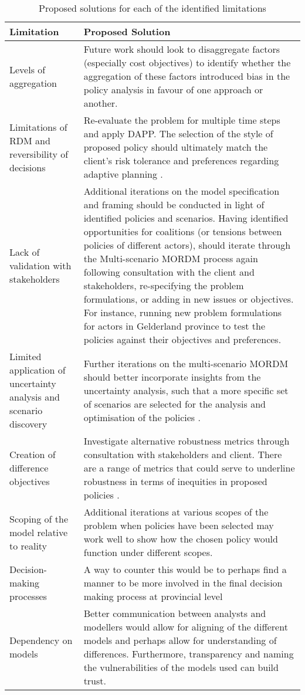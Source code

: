 \begin{table}[h]
\caption{Proposed solutions for each of the identified limitations}
\label{tab:Proposed Solutions}
\centering
\begin{tabular}{p{}|p{}}
\textbf{Limitation} & \textbf{Proposed Solution}  \\ \hline
Levels of aggregation & Future work should look to disaggregate factors (especially cost objectives) to identify whether the aggregation of these factors introduced bias in the policy analysis in favour of one approach or another. \\ \hline
Limitations of RDM and reversibility of decisions & Re-evaluate the problem for multiple time steps and apply DAPP. The selection of the style of proposed policy should ultimately match the client's risk tolerance and preferences regarding adaptive planning \parencite{marchau_decision_2019}. \\ \hline
Lack of validation with stakeholders &Additional iterations on the model specification and framing should be conducted in light of identified policies and scenarios. Having identified opportunities for coalitions (or tensions between policies of different actors), should iterate through the Multi-scenario MORDM process again following consultation with the client and stakeholders, re-specifying the problem formulations, or adding in new issues or objectives. For instance, running new problem formulations for actors in Gelderland province to test the policies against their objectives and preferences. \\ \hline
Limited application of uncertainty analysis and scenario discovery & Further iterations on the multi-scenario MORDM should better incorporate insights from the uncertainty analysis, such that a more specific set of scenarios are selected for the analysis and optimisation of the policies \parencite{watson_incorporating_2017, eker_including_2018}. \\ \hline
Creation of difference objectives & Investigate alternative robustness metrics through consultation with stakeholders and client. There are a range of metrics that could serve to underline robustness in terms of inequities in proposed policies \parencite{mcphail_robustness_2018}. \\ \hline
Scoping of the model relative to reality & Additional iterations at various scopes of the problem when policies have been selected may work well to show how the chosen policy would function under different scopes.        \\ \hline
Decision-making processes & A way to counter this would be to perhaps find a manner to be more involved in the final decision making process at provincial level   \\ \hline
Dependency on models &  Better communication between analysts and modellers would allow for aligning of the different models and perhaps allow for understanding of differences. Furthermore, transparency and naming the vulnerabilities of the models used can build trust. \parencite{saltelli_five_2020}               
\end{tabular}
\end{table}
